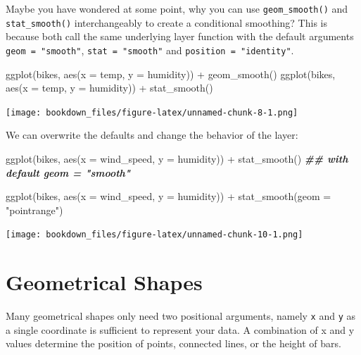 \documentclass[
]{krantz}
\makeatletter
\newenvironment{Shaded}{\begin{snugshade}}{\end{snugshade}}
\newcommand{\AttributeTok}[1]{\textcolor[rgb]{0.61,0.61,0.61}{#1}}
\newcommand{\DocumentationTok}[1]{\textcolor[rgb]{0.37,0.37,0.37}{\textbf{\textit{#1}}}}
\newcommand{\FunctionTok}[1]{\textcolor[rgb]{0,0,0}{#1}}
\newcommand{\NormalTok}[1]{#1}
\newcommand{\SpecialCharTok}[1]{\textcolor[rgb]{0,0,0}{#1}}
\newcommand{\StringTok}[1]{\textcolor[rgb]{0.5,0.5,0.5}{#1}}
\newenvironment{kframe}{%
\medskip{}
\setlength{\fboxsep}{.8em}
 \def\at@end@of@kframe{}%
 \ifinner\ifhmode%
  \def\at@end@of@kframe{\end{minipage}}%
  \begin{minipage}{\columnwidth}%
 \fi\fi%
 \def\FrameCommand##1{\hskip\@totalleftmargin \hskip-\fboxsep
 \colorbox{shadecolor}{##1}\hskip-\fboxsep
     \hskip-\linewidth \hskip-\@totalleftmargin \hskip\columnwidth}%
 \MakeFramed {\advance\hsize-\width
   \@totalleftmargin\z@ \linewidth\hsize
   \@setminipage}}%
 {\par\unskip\endMakeFramed%
 \at@end@of@kframe}
\renewenvironment{Shaded}{\begin{kframe}}{\end{kframe}}
\makeatother
\begin{document}
Maybe you have wondered at some point, why you can use \texttt{geom\_smooth()} and \texttt{stat\_smooth()} interchangeably to create a conditional smoothing? This is because both call the same underlying layer function with the default arguments \texttt{geom\ =\ "smooth"}, \texttt{stat\ =\ "smooth"} and \texttt{position\ =\ "identity"}.

\begin{Shaded}
\begin{Highlighting}[]
\FunctionTok{ggplot}\NormalTok{(bikes, }\FunctionTok{aes}\NormalTok{(}\AttributeTok{x =}\NormalTok{ temp, }\AttributeTok{y =}\NormalTok{ humidity)) }\SpecialCharTok{+} \FunctionTok{geom\_smooth}\NormalTok{()}
\FunctionTok{ggplot}\NormalTok{(bikes, }\FunctionTok{aes}\NormalTok{(}\AttributeTok{x =}\NormalTok{ temp, }\AttributeTok{y =}\NormalTok{ humidity)) }\SpecialCharTok{+} \FunctionTok{stat\_smooth}\NormalTok{()}
\end{Highlighting}
\end{Shaded}

\texttt{[image: bookdown\_files/figure-latex/unnamed-chunk-8-1.png]}

We can overwrite the defaults and change the behavior of the layer:

\begin{Shaded}
\begin{Highlighting}[]
\FunctionTok{ggplot}\NormalTok{(bikes, }\FunctionTok{aes}\NormalTok{(}\AttributeTok{x =}\NormalTok{ wind\_speed, }\AttributeTok{y =}\NormalTok{ humidity)) }\SpecialCharTok{+}
  \FunctionTok{stat\_smooth}\NormalTok{() }\DocumentationTok{\#\# with default \textasciigrave{}geom = "smooth"\textasciigrave{}}

\FunctionTok{ggplot}\NormalTok{(bikes, }\FunctionTok{aes}\NormalTok{(}\AttributeTok{x =}\NormalTok{ wind\_speed, }\AttributeTok{y =}\NormalTok{ humidity)) }\SpecialCharTok{+}
  \FunctionTok{stat\_smooth}\NormalTok{(}\AttributeTok{geom =} \StringTok{"pointrange"}\NormalTok{)}
\end{Highlighting}
\end{Shaded}

\texttt{[image: bookdown\_files/figure-latex/unnamed-chunk-10-1.png]}

\hypertarget{geometrical-shapes}{%
\section{Geometrical Shapes}\label{geometrical-shapes}}

Many geometrical shapes only need two positional arguments, namely \texttt{x} and \texttt{y} as a single coordinate is sufficient to represent your data. A combination of x and y values determine the position of points, connected lines, or the height of bars.
\end{document}
